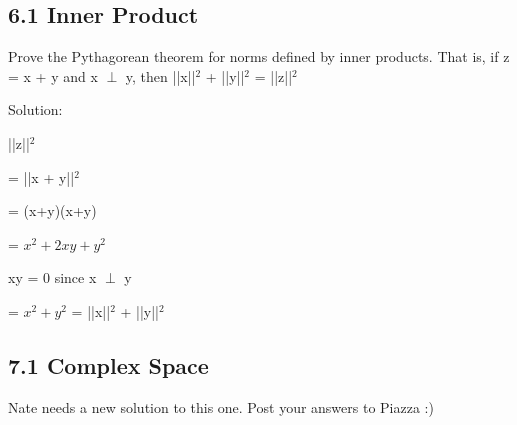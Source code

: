 \documentclass[11pt]{article}
\begin{document}
\subsection*{6.1 \hspace{3mm} Inner Product}
Prove the Pythagorean theorem for norms defined by inner products. That is, if z = x + y and \newline
x $\perp$ y, then ||x||$^2$ + ||y||$^2$ = ||z||$^2$\newline

Solution:
\begin{center}

||z||$^2$

\end{center}
\begin{center}

= ||x + y||$^2$

\end{center}
\begin{center}

= (x+y)(x+y)

\end{center}

\begin{center}

= $x^2 + 2xy + y^2$

\end{center}

\begin{center}

xy = 0 since x $\perp$ y

\end{center}

\begin{center}

= $x^2 + y^2$ = ||x||$^2$ + ||y||$^2$

\end{center}

\subsection*{7.1 \hspace{3mm} Complex Space}

Nate needs a new solution to this one. Post your answers to Piazza :)
\end{document}
